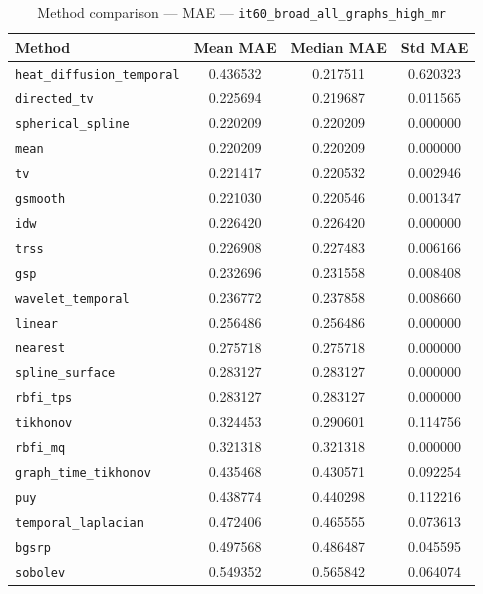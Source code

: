 \begin{table}[ht]
\centering
\caption{Method comparison — MAE — \texttt{it60_broad_all_graphs_high_mr}}
\label{tab:mae_it60_broad_all_graphs_high_mr}
\begin{tabular}{lccc}
\hline
Method & Mean MAE & Median MAE & Std MAE \\
\hline
\texttt{heat_diffusion_temporal} & 0.436532 & 0.217511 & 0.620323 \\
\texttt{directed_tv} & 0.225694 & 0.219687 & 0.011565 \\
\texttt{spherical_spline} & 0.220209 & 0.220209 & 0.000000 \\
\texttt{mean} & 0.220209 & 0.220209 & 0.000000 \\
\texttt{tv} & 0.221417 & 0.220532 & 0.002946 \\
\texttt{gsmooth} & 0.221030 & 0.220546 & 0.001347 \\
\texttt{idw} & 0.226420 & 0.226420 & 0.000000 \\
\texttt{trss} & 0.226908 & 0.227483 & 0.006166 \\
\texttt{gsp} & 0.232696 & 0.231558 & 0.008408 \\
\texttt{wavelet_temporal} & 0.236772 & 0.237858 & 0.008660 \\
\texttt{linear} & 0.256486 & 0.256486 & 0.000000 \\
\texttt{nearest} & 0.275718 & 0.275718 & 0.000000 \\
\texttt{spline_surface} & 0.283127 & 0.283127 & 0.000000 \\
\texttt{rbfi_tps} & 0.283127 & 0.283127 & 0.000000 \\
\texttt{tikhonov} & 0.324453 & 0.290601 & 0.114756 \\
\texttt{rbfi_mq} & 0.321318 & 0.321318 & 0.000000 \\
\texttt{graph_time_tikhonov} & 0.435468 & 0.430571 & 0.092254 \\
\texttt{puy} & 0.438774 & 0.440298 & 0.112216 \\
\texttt{temporal_laplacian} & 0.472406 & 0.465555 & 0.073613 \\
\texttt{bgsrp} & 0.497568 & 0.486487 & 0.045595 \\
\texttt{sobolev} & 0.549352 & 0.565842 & 0.064074 \\
\hline
\end{tabular}
\end{table}
